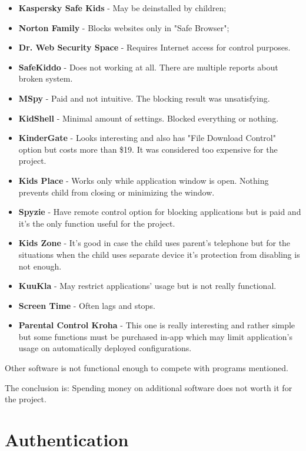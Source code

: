 \begin{itemize}
\item \textbf{Kaspersky Safe Kids} - May be deinstalled by children;
\item \textbf{Norton Family} - Blocks websites only in "Safe Browser";
\item \textbf{Dr. Web Security Space} - Requires Internet access for
control purposes.
\item \textbf{SafeKiddo} - Does not working at all. There are multiple
reports about broken system.
\item \textbf{MSpy} - Paid and not intuitive. The blocking result was
unsatisfying.
\item \textbf{KidShell} - Minimal amount of settings. Blocked everything
or nothing.
\item \textbf{KinderGate} - Looks interesting and also has "File Download
Control" option but costs more than \$19. It was considered too expensive
for the project.
\item \textbf{Kids Place} - Works only while application window is open.
Nothing prevents child from closing or minimizing the window.
\item \textbf{Spyzie} - Have remote control option for blocking
applications but is paid and it's the only function useful for the
project.
\item \textbf{Kids Zone} - It's good in case the child uses parent's
telephone but for the situations when the child uses separate device
it's protection from disabling is not enough.
\item \textbf{KuuKla} - May restrict applications' usage but is not
really functional.
\item \textbf{Screen Time} - Often lags and stops.
\item \textbf{Parental Control Kroha} - This one is really interesting
and rather simple but some functions must be purchased in-app which
may limit application's usage on automatically deployed configurations.
\end{itemize}

Other software is not functional enough to compete with programs
mentioned.

The conclusion is: Spending money on additional software does not
worth it for the project.


\section{Authentication}

